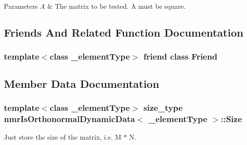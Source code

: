 \begin{DoxyParams}{Parameters}
{\em A} & The matrix to be tested. A must be square. \\
\hline
\end{DoxyParams}


\subsection{Friends And Related Function Documentation}
\hypertarget{classnmr_is_orthonormal_dynamic_data_a7f8321d57e81bc613d5dbef3410ba70e}{}
\subsubsection[{Friend}]{\setlength{\rightskip}{0pt plus 5cm}template$<$class \+\_\+element\+Type$>$ friend class {\bf Friend}\hspace{0.3cm}{\ttfamily [friend]}}\label{classnmr_is_orthonormal_dynamic_data_a7f8321d57e81bc613d5dbef3410ba70e}


\subsection{Member Data Documentation}
\hypertarget{classnmr_is_orthonormal_dynamic_data_a0335e18e8d4291e9c9ce6f6c3b7f68f0}{}
\subsubsection[{Size}]{\setlength{\rightskip}{0pt plus 5cm}template$<$class \+\_\+element\+Type$>$ {\bf size\+\_\+type} {\bf nmr\+Is\+Orthonormal\+Dynamic\+Data}$<$ \+\_\+element\+Type $>$\+::Size\hspace{0.3cm}{\ttfamily [protected]}}\label{classnmr_is_orthonormal_dynamic_data_a0335e18e8d4291e9c9ce6f6c3b7f68f0}
Just store the size of the matrix, i.\+e. M $\ast$ N. \hypertarget{classnmr_is_orthonormal_dynamic_data_aa64db85fa3c9904a4fb2c917dd171ae6}{}
